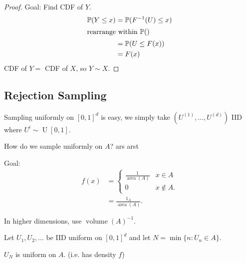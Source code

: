 \begin{proof}
    Goal: Find CDF of $Y$.
    \begin{align*}
        \mathbb{P}(Y \leq x) &= \mathbb{P}(F^{-1}(U) \leq x) \\
        \intertext{rearrange within $\mathbb{P}()$}
        &= \mathbb{P}(U \leq F(x)) \\
        &= F(x)
    \end{align*} 
    CDF of $Y =$ CDF of $X$, so $Y \sim X$.
\end{proof} 

\subsection{Rejection Sampling}

Sampling uniformly on $[0, 1]^d$ is easy, we simply take $(U^{(1)}, \dots, U^{(d)})$ IID where $U^i \sim \operatorname{U}[0, 1]$.

\begin{question}
    How do we sample uniformly on $A$?
    ars
    arst
\end{question} 

Goal: \begin{align*}
    f(x) &= \begin{cases}
        \frac{1}{\operatorname{area}(A)} & x \in A \\
        0 & x \notin A.
    \end{cases} \\
    &= \frac{1_A}{\operatorname{area}(A)}.
\end{align*}

\color{blue} In higher dimensions, use  $\operatorname{volume}(A)^{-1}$. \color{black}

Let $U_1, U_2, \dots$ be IID uniform on $[0, 1]^d$ and let $N = \min \{n : U_n \in A\}$.

\begin{claim}
    $U_N$ is uniform on $A$. (i.e. has density $f$)
\end{claim} 

